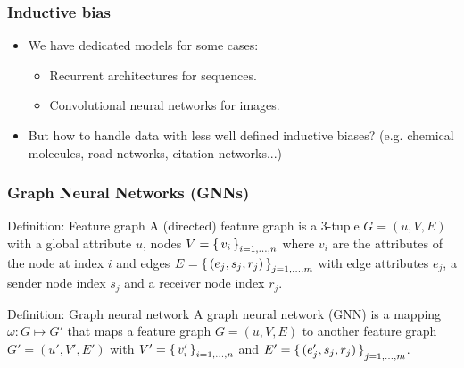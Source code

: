 \documentclass{beamer}
\begin{document}
\begin{frame}
\frametitle{Inductive bias}
\begin{itemize}
\item We have dedicated models for some cases: \pause
\begin{itemize}
\item Recurrent architectures for sequences. \pause
\item Convolutional neural networks for images. \pause 
\end{itemize}
\item But how to handle data with less well defined inductive biases? (e.g. chemical molecules, road networks, citation networks...)  
\end{itemize}
\end{frame}

\begin{frame}
\frametitle{Graph Neural Networks (GNNs)}

\begin{block}{Definition: Feature graph}
A (directed) feature graph is a 3-tuple $G=(u,V,E)$ with a global attribute $u$, nodes $V = \set{v_i}_{i=1,\dots,n}$ where $v_i$ are the attributes of the node at index $i$ and edges $E = \set{(e_j, s_j, r_j)}_{j=1,\dots,m}$ with edge attributes $e_j$, a sender node index $s_j$ and a receiver node index $r_j$. 
\end{block} \pause

\begin{block}{Definition: Graph neural network}
A graph neural network (GNN) is a mapping $\omega: G \mapsto G'$ that maps a feature graph $G=(u,V,E)$ to another feature graph $G'=(u', V', E')$ with $V'=\set{v'_i}_{i=1,\dots,n}$ and $E'=\set{(e'_j, s_j, r_j)}_{j=1,\dots,m}$. 
\end{block}
\end{frame}
\end{document}
